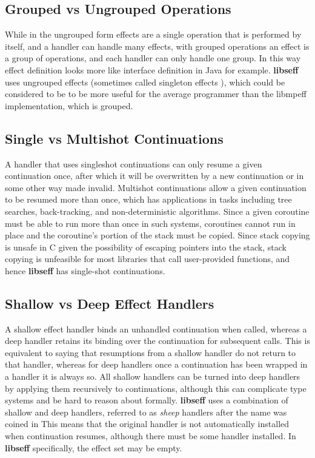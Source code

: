 \documentclass[logo,bsc,singlespacing,parskip,online]{infthesis}
\begin{document}
\subsection{Grouped vs Ungrouped Operations}

While in the ungrouped form effects are a single operation that is performed by itself, and a handler can handle many effects, with grouped operations an effect is a group of operations, and each handler can only handle one group. In this way effect definition looks more like interface definition in Java for example. \textbf{libseff} uses ungrouped effects (sometimes called singleton effects \citep{effekt-website}), which could be considered to be to be more useful for the average programmer than the libmpeff implementation, which is grouped.

\subsection{Single vs Multishot Continuations}

A handler that uses singleshot continuations can only resume a given continuation once, after which it will be overwritten by a new continuation or in some other way made invalid. Multishot continuations allow a given continuation to be resumed more than once, which has applications in tasks including tree searches, back-tracking, and non-deterministic algorithms. Since a given coroutine must be able to run more than once in such systems, coroutines cannot run in place and the coroutine's portion of the stack must be copied.\citep{libseff_paper} Since stack copying is unsafe in C given the possibility of escaping pointers into the stack, stack copying is unfeasible for most libraries that call user-provided functions, and hence \textbf{libseff} has single-shot continuations.

\subsection{Shallow vs Deep Effect Handlers}

A shallow effect handler binds an unhandled continuation when called, whereas a deep handler retains its binding over the continuation for subsequent calls. This is equivalent to saying that resumptions from a shallow handler do not return to that handler, whereas for deep handlers once a continuation has been wrapped in a handler it is always so. All shallow handlers can be turned into deep handlers by applying them recursively to continuations, although this can complicate type systems and be hard to reason about formally. \textbf{libseff} uses a combination of shallow and deep handlers, referred to as \textit{sheep} handlers after the name was coined in \textcite{wasmFX}
This means that the original handler is not automatically installed when continuation resumes, although there must be some handler installed. In \textbf{libseff} specifically, the effect set may be empty. \citep{libseff_paper}
\end{document}
